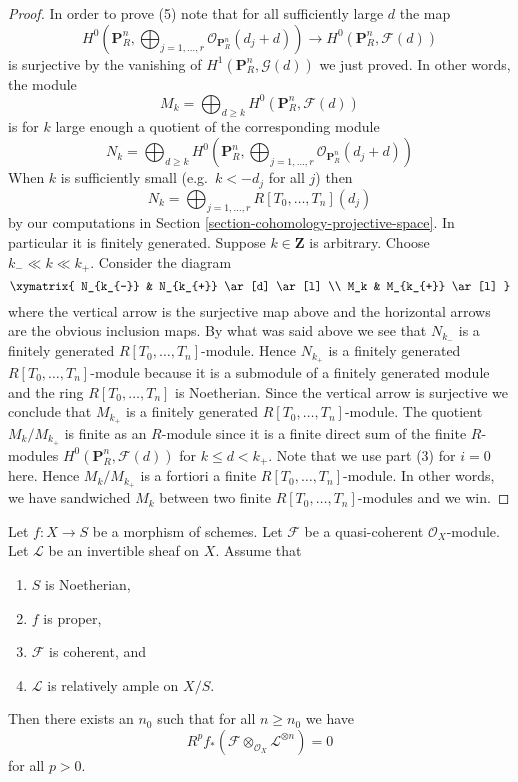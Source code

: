\begin{proof}
\medskip\noindent
In order to prove (5) note that for all sufficiently large $d$
the map
$$
H^0(\mathbf{P}^n_R, \bigoplus\nolimits_{j = 1, \ldots, r}
\mathcal{O}_{\mathbf{P}^n_R}(d_j + d))
\to
H^0(\mathbf{P}^n_R, \mathcal{F}(d))
$$
is surjective by the vanishing of $H^1(\mathbf{P}^n_R, \mathcal{G}(d))$
we just proved. In other words, the module
$$
M_k
=
\bigoplus\nolimits_{d \geq k} H^0(\mathbf{P}^n_R, \mathcal{F}(d))
$$
is for $k$ large enough a quotient of the corresponding module
$$
N_k
=
\bigoplus\nolimits_{d \geq k} H^0(\mathbf{P}^n_R,
\bigoplus\nolimits_{j = 1, \ldots, r}
\mathcal{O}_{\mathbf{P}^n_R}(d_j + d)
)
$$
When $k$ is sufficiently small (e.g.\ $k < -d_j$ for all $j$) then
$$
N_k = \bigoplus\nolimits_{j = 1, \ldots, r}
R[T_0, \ldots, T_n](d_j)
$$
by our computations in Section \ref{section-cohomology-projective-space}.
In particular it is finitely generated.
Suppose $k \in \mathbf{Z}$ is arbitrary.
Choose $k_{-} \ll k \ll k_{+}$.
Consider the diagram
$$
\xymatrix{
N_{k_{-}} & N_{k_{+}} \ar[d] \ar[l] \\
M_k & M_{k_{+}} \ar[l]
}
$$
where the vertical arrow is the surjective map above and
the horizontal arrows are the obvious inclusion maps.
By what was said above we see that $N_{k_{-}}$ is a finitely
generated $R[T_0, \ldots, T_n]$-module. Hence $N_{k_{+}}$ is
a finitely generated $R[T_0, \ldots, T_n]$-module because it
is a submodule of a finitely generated module and the ring
$R[T_0, \ldots, T_n]$ is Noetherian. Since the vertical arrow
is surjective we conclude that $M_{k_{+}}$ is a finitely
generated $R[T_0, \ldots, T_n]$-module. The quotient
$M_k/M_{k_{+}}$ is finite as an $R$-module since it is a
finite direct sum of the finite $R$-modules
$H^0(\mathbf{P}^n_R, \mathcal{F}(d))$ for $k \leq d < k_{+}$.
Note that we use part (3) for $i = 0$ here. Hence
$M_k/M_{k_{+}}$ is a fortiori a finite $R[T_0, \ldots, T_n]$-module.
In other words, we have sandwiched $M_k$ between two finite
$R[T_0, \ldots, T_n]$-modules and we win.
\end{proof}

\begin{lemma}
\label{lemma-kill-by-twisting}
Let $f : X \to S$ be a morphism of schemes.
Let $\mathcal{F}$ be a quasi-coherent $\mathcal{O}_X$-module.
Let $\mathcal{L}$ be an invertible sheaf on $X$.
Assume that
\begin{enumerate}
\item $S$ is Noetherian,
\item $f$ is proper,
\item $\mathcal{F}$ is coherent, and
\item $\mathcal{L}$ is relatively ample on $X/S$.
\end{enumerate}
Then there exists an $n_0$ such that for all $n \geq n_0$
we have
$$
R^pf_*\left(\mathcal{F} \otimes_{\mathcal{O}_X} \mathcal{L}^{\otimes n}\right)
=
0
$$
for all $p > 0$.
\end{lemma}

